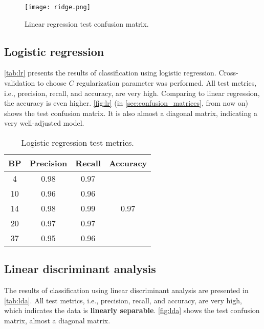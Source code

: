         \begin{figure}[H]
                \texttt{[image: ridge.png]}
                \caption{Linear regression test confusion matrix.}
                \label{fig:rigde}
        \end{figure}

    \subsection{Logistic regression}

        \autoref{tab:lr} presents the results of classification using logistic regression. Cross-validation to choose $C$ regularization parameter was performed. All test metrics, i.e., precision, recall, and accuracy, are very high. Comparing to linear regression, the accuracy is even higher. \autoref{fig:lr} (in \autoref{sec:confusion_matrices}, from now on) shows the test confusion matrix. It is also almost a diagonal matrix, indicating a very well-adjusted model.

        \begin{table}[H]
                \centering
                \caption{Logistic regression test metrics.}
                \label{tab:lr}
                \begin{tabular}{c|cc|c}
                BP & Precision & Recall & Accuracy              \\ \hline
                4  & 0.98      & 0.97   & \multirow{5}{*}{0.97} \\
                10 & 0.96      & 0.96   &                       \\
                14 & 0.98      & 0.99   &                       \\
                20 & 0.97      & 0.97   &                       \\
                37 & 0.95      & 0.96   &                      
                \end{tabular}
        \end{table}

    \subsection{Linear discriminant analysis}

        The results of classification using linear discriminant analysis are presented in \autoref{tab:lda}. All test metrics, i.e., precision, recall, and accuracy, are very high, which indicates the data is \textbf{linearly separable}. \autoref{fig:lda} shows the test confusion matrix, almost a diagonal matrix.

